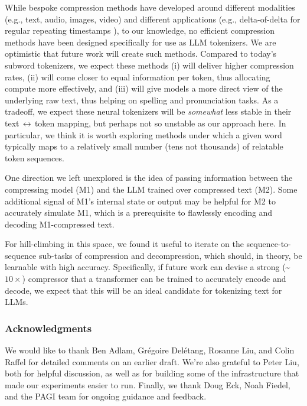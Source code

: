 While bespoke compression methods have developed around different modalities (e.g., text, audio, images, video) and different applications (e.g., delta-of-delta for regular repeating timestamps \cite{delta-of-delta}), to our knowledge, no efficient compression methods have been designed specifically for use as LLM tokenizers. We are optimistic that future work will create such methods. Compared to today's subword tokenizers, we expect these methods (i) will deliver higher compression rates, (ii) will come closer to equal information per token, thus allocating compute more effectively, and (iii) will give models a more direct view of the underlying raw text, thus helping on spelling and pronunciation tasks. As a tradeoff, we expect these neural tokenizers will be \emph{somewhat} less stable in their text\,$\leftrightarrow$\,token mapping, but perhaps not so unstable as our approach here. In particular, we think it is worth exploring methods under which a given word typically maps to a relatively small number (tens not thousands) of relatable token sequences.

One direction we left unexplored is the idea of passing information between the compressing model (M1) and the LLM trained over compressed text (M2)\@. Some additional signal of M1's internal state or output may be helpful for M2 to accurately simulate M1, which is a prerequisite to flawlessly encoding and decoding M1-compressed text.

For hill-climbing in this space, we found it useful to iterate on the sequence-to-sequence sub-tasks of compression and decompression, which should, in theory, be learnable with high accuracy. Specifically, if future work can devise a strong (\textasciitilde{}$10\times$) compressor that a transformer can be trained to accurately encode and decode, we expect that this will be an ideal candidate for tokenizing text for LLMs.

\subsubsection*{Acknowledgments}

We would like to thank Ben Adlam, Grégoire Delétang, Rosanne Liu, and Colin Raffel for detailed comments on an earlier draft. We're also grateful to Peter Liu, both for helpful discussion, as well as for building some of the infrastructure that made our experiments easier to run. Finally, we thank Doug Eck, Noah Fiedel, and the PAGI team for ongoing guidance and feedback.


